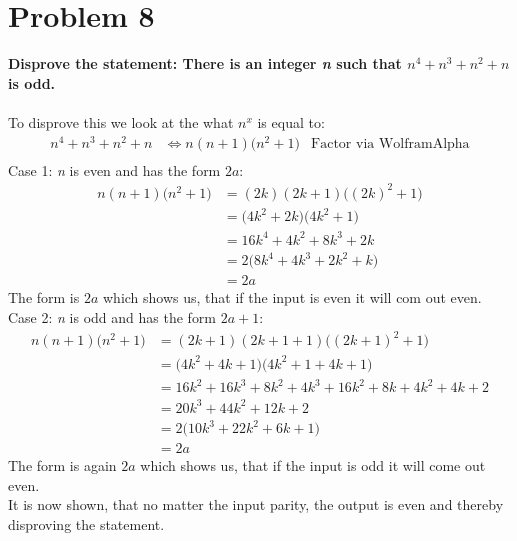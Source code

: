 \documentclass[english,10pt,a4paper]{article}
\begin{document}
\section*{Problem 8}
\textbf{Disprove the statement: There is an integer \textit{n} such that $n^4+n^3+n^2+n$ is odd.}
\\
\\
To disprove this we look at the what $n^x$ is equal to:
\begin{align}
n^4+n^3+n^2+n &\Leftrightarrow n(n+1)\Big(n^2+1\Big) & \text{Factor via WolframAlpha}\\
\end{align}
Case 1: \textit{n} is even and has the form $2a$:
\begin{align}
n(n+1)\Big(n^2+1\Big) &= (2k)(2k+1)\Big((2k)^2+1\Big)\\
	&=\Big(4k^2+2k\Big)\Big(4k^2+1\Big)\\
	&=16k^4+4k^2+8k^3+2k\\
	&=2\Big(8k^4+4k^3+2k^2+k\Big)\\
	&=2a
\end{align}
The form is $2a$ which shows us, that if the input is even it will com out even.
\\
Case 2: \textit{n} is odd and has the form $2a+1$:
\begin{align}
n(n+1)\Big(n^2+1\Big) &= (2k+1)(2k+1+1)\Big((2k+1)^2+1\Big)\\
	&=\Big(4k^2+4k+1\Big)\Big(4k^2+1+4k+1\Big)\\
	&=16k^2+16k^3+8k^2+4k^3+16k^2+8k+4k^2+4k+2\\
	&=20k^3+44k^2+12k+2\\
	&=2\Big(10k^3+22k^2+6k+1\Big)\\
	&=2a
\end{align}
The form is again $2a$ which shows us, that if the input is odd it will come out even.
\\
It is now shown, that no matter the input parity, the output is even and thereby disproving the statement.
\end{document}
